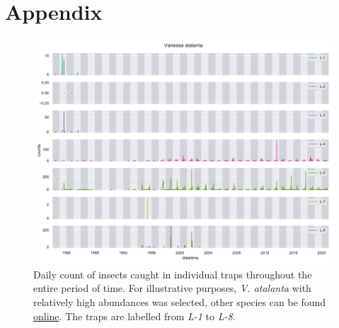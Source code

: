 \section{Appendix}\label{appendix}

\begin{figure}[H]
	\centering
	\includegraphics[width=0.9\linewidth]{figs/v-atalanta_single-traps}
	\caption{Daily count of insects caught in individual traps throughout the entire period of time. For illustrative purposes, \textit{V. atalanta} with relatively high abundances was selected, other species can be found \href{https://github.com/gtlab-barcelona/Robert/tree/main/data-exploration_first-last/figs/species_kaliningrad_time-evol_single-traps}{online}. The traps are labelled from \textit{L-1} to \textit{L-8}.}
	\label{fig:v-atalanta}
\end{figure}


